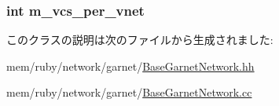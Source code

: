 \label{classBaseGarnetNetwork_a1038a746216e1aea3308b50c4b3120ed}
\hypertarget{classBaseGarnetNetwork_af81627216f0e6599e8536f1aeee22abc}{
\subsubsection[{m\_\-vcs\_\-per\_\-vnet}]{\setlength{\rightskip}{0pt plus 5cm}int {\bf m\_\-vcs\_\-per\_\-vnet}}}
\label{classBaseGarnetNetwork_af81627216f0e6599e8536f1aeee22abc}


このクラスの説明は次のファイルから生成されました:\begin{DoxyCompactItemize}
\item 
mem/ruby/network/garnet/\hyperlink{BaseGarnetNetwork_8hh}{BaseGarnetNetwork.hh}\item 
mem/ruby/network/garnet/\hyperlink{BaseGarnetNetwork_8cc}{BaseGarnetNetwork.cc}\end{DoxyCompactItemize}
